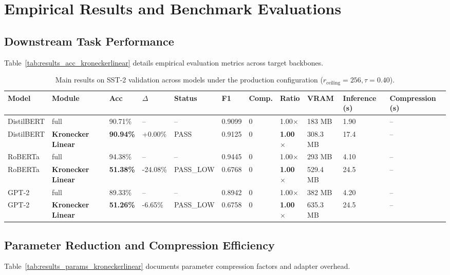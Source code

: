 \section{Empirical Results and Benchmark Evaluations}

\subsection{Downstream Task Performance}
Table~\ref{tab:results_acc_kroneckerlinear} details empirical evaluation metrics across target backbones.

\begin{table}[t]
\centering
\small
\begin{tabular}{lllllllllll}
\toprule
\textbf{Model} & \textbf{Module} & \textbf{Acc} & \textbf{$\Delta$} & \textbf{Status} & \textbf{F1} & \textbf{Comp.} & \textbf{Ratio} & \textbf{VRAM} & \textbf{Inference (s)} & \textbf{Compression (s)} \\
\midrule
DistilBERT & full & 90.71\% & -- & -- & 0.9099 & 0 & 1.00$\times$ & 183 MB & 1.90 & -- \\
DistilBERT & \textbf{Kronecker Linear} & \textbf{90.94\%} & +0.00\% & PASS & 0.9125 & 0 & \textbf{1.00$\times$} & 308.3 MB & 17.4 & -- \\
RoBERTa & full & 94.38\% & -- & -- & 0.9445 & 0 & 1.00$\times$ & 293 MB & 4.10 & -- \\
RoBERTa & \textbf{Kronecker Linear} & \textbf{51.38\%} & -24.08\% & PASS\_LOW & 0.6768 & 0 & \textbf{1.00$\times$} & 529.4 MB & 24.5 & -- \\
GPT-2 & full & 89.33\% & -- & -- & 0.8942 & 0 & 1.00$\times$ & 382 MB & 4.20 & -- \\
GPT-2 & \textbf{Kronecker Linear} & \textbf{51.26\%} & -6.65\% & PASS\_LOW & 0.6758 & 0 & \textbf{1.00$\times$} & 635.3 MB & 24.5 & -- \\
\bottomrule
\end{tabular}
\caption{Main results on SST-2 validation across models under the production configuration ($r_{\mathrm{ceiling}}=256, \tau=0.40$).}
\label{tab:main_sst2}
\end{table}

\subsection{Parameter Reduction and Compression Efficiency}
Table~\ref{tab:results_params_kroneckerlinear} documents parameter compression factors and adapter overhead.

